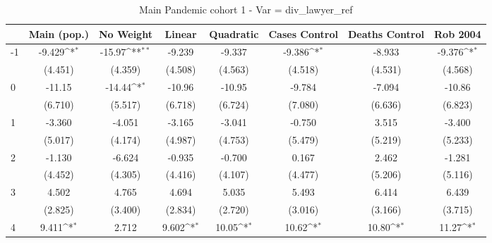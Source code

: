 \documentclass{article}
\begin{document}
{
\def\sym#1{\ifmmode^{#1}\else\(^{#1}\)\fi}
\begin{longtable}{l*{7}{c}}
\caption{Main Pandemic cohort 1 - Var = div\_lawyer\_ref}\\
\hline\hline\endfirsthead\hline\endhead\hline\endfoot\endlastfoot
                &\multicolumn{1}{c}{Main (pop.)}&\multicolumn{1}{c}{No Weight}&\multicolumn{1}{c}{Linear}&\multicolumn{1}{c}{Quadratic}&\multicolumn{1}{c}{Cases Control}&\multicolumn{1}{c}{Deaths Control}&\multicolumn{1}{c}{Rob 2004}\\
\hline
-1              &   -9.429\sym{*}  &   -15.97\sym{**} &   -9.239         &   -9.337         &   -9.386\sym{*}  &   -8.933         &   -9.376\sym{*}  \\
                &  (4.451)         &  (4.359)         &  (4.508)         &  (4.563)         &  (4.518)         &  (4.531)         &  (4.568)         \\
0               &   -11.15         &   -14.44\sym{*}  &   -10.96         &   -10.95         &   -9.784         &   -7.094         &   -10.86         \\
                &  (6.710)         &  (5.517)         &  (6.718)         &  (6.724)         &  (7.080)         &  (6.636)         &  (6.823)         \\
1               &   -3.360         &   -4.051         &   -3.165         &   -3.041         &   -0.750         &    3.515         &   -3.400         \\
                &  (5.017)         &  (4.174)         &  (4.987)         &  (4.753)         &  (5.479)         &  (5.219)         &  (5.233)         \\
2               &   -1.130         &   -6.624         &   -0.935         &   -0.700         &    0.167         &    2.462         &   -1.281         \\
                &  (4.452)         &  (4.305)         &  (4.416)         &  (4.107)         &  (4.477)         &  (5.206)         &  (5.116)         \\
3               &    4.502         &    4.765         &    4.694         &    5.035         &    5.493         &    6.414         &    6.439         \\
                &  (2.825)         &  (3.400)         &  (2.834)         &  (2.720)         &  (3.016)         &  (3.166)         &  (3.715)         \\
4               &    9.411\sym{*}  &    2.712         &    9.602\sym{*}  &    10.05\sym{*}  &    10.62\sym{*}  &    10.80\sym{*}  &    11.27\sym{*}  \\

\end{longtable}}
\end{document}
